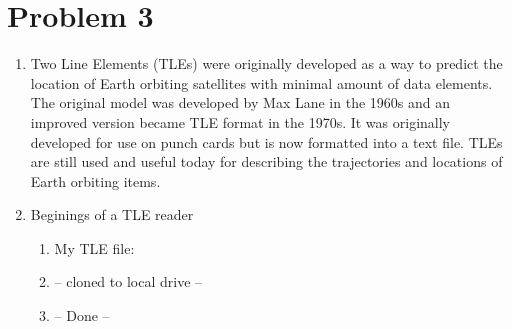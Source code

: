 \documentclass{article}
\begin{document}
\section*{Problem 3}
\begin{enumerate}[label=(\alph*)]
	\item Two Line Elements (TLEs) were originally developed as a way to predict the location of Earth orbiting satellites with minimal amount of data elements. The original model was developed by Max Lane in the 1960s and an improved version became TLE format in the 1970s. It was originally developed for use on punch cards but is now formatted into a text file. TLEs are still used and useful today for describing the trajectories and locations of Earth orbiting items. 
	\item Beginings of a TLE reader
	\begin{enumerate}[label=(\roman*)]
		\item My TLE file:
		
		\item -- cloned to local drive --
		\item -- Done --
		

\end{enumerate}
\end{enumerate}
\end{document}
